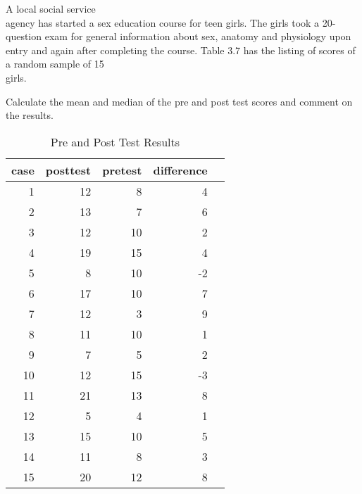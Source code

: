 \documentclass[11pt]{book}\usepackage[]{graphicx}\usepackage[]{color}
\begin{document}
\begin{exercises}
	\begin{exercise} %

A local social service \\ agency has started a sex education course for teen girls.  The girls took a 20-question exam for general information about sex, anatomy and physiology upon entry and again after completing the course.  Table 3.7 has the listing of scores of a random sample of 15 \\ girls.

Calculate the mean and median of the pre and post test scores and comment on the results.

\begin{table}[ht]
 \centering
 \caption{Pre and Post Test Results}

 {\small{
 \begin{tabular}{@{} rrrrr @{}}
   \hline
   case & posttest & pretest & difference \\
   \hline
    1 &  12 &   8 &   4 \\
      2 &  13 &   7 &   6 \\
      3 &  12 &  10 &   2 \\
      4 &  19 &  15 &   4 \\
      5 &   8 &  10 &  -2 \\
      6 &  17 &  10 &   7 \\
      7 &  12 &   3 &   9 \\
      8 &  11 &  10 &   1 \\
      9 &   7 &   5 &   2 \\
     10 &  12 &  15 &  -3 \\
     11 &  21 &  13 &   8 \\
     12 &   5 &   4 &   1 \\
     13 &  15 &  10 &   5 \\
     14 &  11 &   8 &   3 \\
     15 &  20 &  12 &   8 \\
    \hline
 \end{tabular}
 }}

 \label{tab:t3_14}
\end{table}

	\vspace{2mm}
	\end{exercise}
	\vspace{2mm}
	\begin{solution}  %





\end{solution}
\end{exercises}
\end{document}
